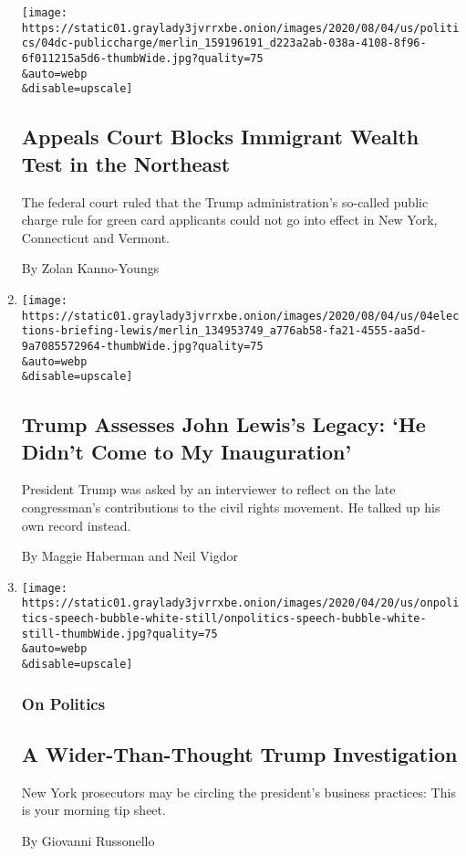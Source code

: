 \begin{enumerate}
  \texttt{[image: https://static01.graylady3jvrrxbe.onion/images/2020/08/04/us/politics/04dc-publiccharge/merlin\_159196191\_d223a2ab-038a-4108-8f96-6f011215a5d6-thumbWide.jpg?quality=75\\\&auto=webp\\\&disable=upscale]}

  \hypertarget{appeals-court-blocks-immigrant-wealth-test-in-the-northeast}{%
  \subsection{Appeals Court Blocks Immigrant Wealth Test in the
  Northeast}\label{appeals-court-blocks-immigrant-wealth-test-in-the-northeast}}

  The federal court ruled that the Trump administration's so-called
  public charge rule for green card applicants could not go into effect
  in New York, Connecticut and Vermont.

  By Zolan Kanno-Youngs
\item
  \href{/2020/08/04/us/politics/trump-john-lewis-axios.html}{}

  \texttt{[image: https://static01.graylady3jvrrxbe.onion/images/2020/08/04/us/04elections-briefing-lewis/merlin\_134953749\_a776ab58-fa21-4555-aa5d-9a7085572964-thumbWide.jpg?quality=75\\\&auto=webp\\\&disable=upscale]}

  \hypertarget{trump-assesses-john-lewiss-legacy-he-didnt-come-to-my-inauguration}{%
  \subsection{Trump Assesses John Lewis's Legacy: `He Didn't Come to My
  Inauguration'}\label{trump-assesses-john-lewiss-legacy-he-didnt-come-to-my-inauguration}}

  President Trump was asked by an interviewer to reflect on the late
  congressman's contributions to the civil rights movement. He talked up
  his own record instead.

  By Maggie Haberman and Neil Vigdor
\item
  \href{/2020/08/04/us/politics/trump-prosecutors.html}{}

  \texttt{[image: https://static01.graylady3jvrrxbe.onion/images/2020/04/20/us/onpolitics-speech-bubble-white-still/onpolitics-speech-bubble-white-still-thumbWide.jpg?quality=75\\\&auto=webp\\\&disable=upscale]}

  \hypertarget{on-politics}{%
  \subsubsection{On Politics}\label{on-politics}}

  \hypertarget{a-wider-than-thought-trump-investigation}{%
  \subsection{A Wider-Than-Thought Trump
  Investigation}\label{a-wider-than-thought-trump-investigation}}

  New York prosecutors may be circling the president's business
  practices: This is your morning tip sheet.

  By Giovanni Russonello
\end{enumerate}


